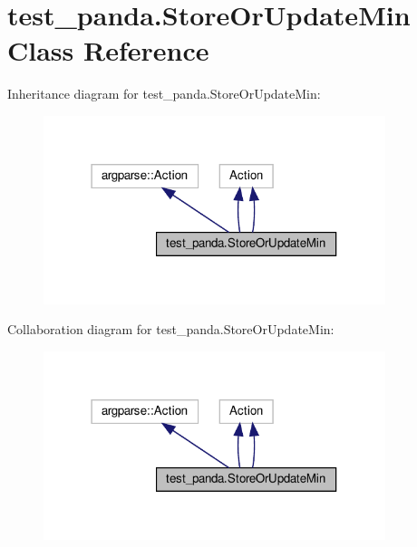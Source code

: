 \hypertarget{classtest__panda_1_1StoreOrUpdateMin}{}\section{test\+\_\+panda.\+Store\+Or\+Update\+Min Class Reference}
\label{classtest__panda_1_1StoreOrUpdateMin}


Inheritance diagram for test\+\_\+panda.\+Store\+Or\+Update\+Min\+:
\nopagebreak
\begin{figure}[H]
\begin{center}
\leavevmode
\includegraphics[width=283pt]{de/d7a/classtest__panda_1_1StoreOrUpdateMin__inherit__graph}
\end{center}
\end{figure}


Collaboration diagram for test\+\_\+panda.\+Store\+Or\+Update\+Min\+:
\nopagebreak
\begin{figure}[H]
\begin{center}
\leavevmode
\includegraphics[width=283pt]{dd/d77/classtest__panda_1_1StoreOrUpdateMin__coll__graph}
\end{center}
\end{figure}
